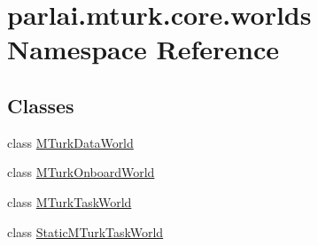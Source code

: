 \hypertarget{namespaceparlai_1_1mturk_1_1core_1_1worlds}{}\section{parlai.\+mturk.\+core.\+worlds Namespace Reference}
\label{namespaceparlai_1_1mturk_1_1core_1_1worlds}
\subsection*{Classes}
\begin{DoxyCompactItemize}
\item 
class \hyperlink{classparlai_1_1mturk_1_1core_1_1worlds_1_1MTurkDataWorld}{M\+Turk\+Data\+World}
\item 
class \hyperlink{classparlai_1_1mturk_1_1core_1_1worlds_1_1MTurkOnboardWorld}{M\+Turk\+Onboard\+World}
\item 
class \hyperlink{classparlai_1_1mturk_1_1core_1_1worlds_1_1MTurkTaskWorld}{M\+Turk\+Task\+World}
\item 
class \hyperlink{classparlai_1_1mturk_1_1core_1_1worlds_1_1StaticMTurkTaskWorld}{Static\+M\+Turk\+Task\+World}
\end{DoxyCompactItemize}
